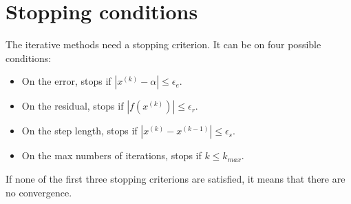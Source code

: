 \documentclass[12pt, a4paper]{report}
\newtheorem[style=M,bodystyle=\normalfont]{theorem}{Theorem}
\newtheorem[style=M,bodystyle=\normalfont]{proposition}{Proposition}
\newtheorem[style=M,bodystyle=\normalfont]{corollary}{Corollary}
\newtheorem[style=M,bodystyle=\normalfont]{lemma}{Lemma}
\newtheorem[style=M,bodystyle=\normalfont]{definition}{Definition}
\begin{document}
    \section{Stopping conditions}
    The iterative methods need a stopping criterion. It can be on four possible conditions: 
    \begin{itemize}
        \item On the error, stops if $\left\lvert x^{(k)}-\alpha \right\rvert \leq \epsilon_e$.
        \item On the residual, stops if $\left\lvert f\left(x^{(k)}\right) \right\rvert \leq \epsilon_r$. 
        \item On the step length, stops if $\left\lvert x^{(k)}-x^{(k-1)} \right\rvert \leq \epsilon_s$. 
        \item On the max numbers of iterations, stops if $k \leq k_{max}$. 
    \end{itemize}
    If none of the first three stopping criterions are satisfied, it means that there are no convergence. 
\end{document}
